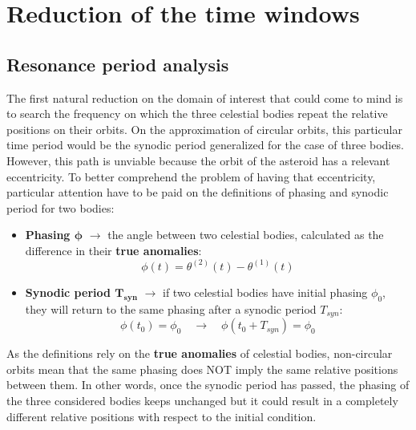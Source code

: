 \section{Reduction of the time windows}
\label{sec:time_red}

\subsection{Resonance period analysis}
\label{subsec:res_period}

The first natural reduction on the domain of interest that could come to mind is to search the frequency on which the three celestial bodies repeat the relative positions on their orbits. On the approximation of circular orbits, this particular time period would be the synodic period generalized for the case of three bodies.
However, this path is unviable because the orbit of the asteroid has a relevant eccentricity. To better comprehend the problem of having that eccentricity, particular attention have to be paid on the definitions of phasing and synodic period for two bodies:

\begin{itemize}
    [wide,itemsep=3pt,topsep=3pt]
    \item \textbf{Phasing $\bm{\phi}$} $\rightarrow$ the angle between two celestial bodies, calculated as the difference in their \textbf{true anomalies}:
    \vspace*{-8pt}
    \begin{equation}
        \phi (t) = \theta^{(2)} (t) - \theta^{(1)} (t)
    \end{equation}

    \item \textbf{Synodic period $\bm{T_{syn}}$} $\rightarrow$ if two celestial bodies have initial phasing $\phi_0$, they will return to the same phasing after a synodic period $T_{syn}$:
    \vspace*{-10pt}
    \begin{equation}
        \phi (t_0) = \phi_0 \quad \rightarrow \quad
        \phi (t_0 + T_{syn}) = \phi_0
    \end{equation}
\end{itemize}

As the definitions rely on the \textbf{true anomalies} of celestial bodies, non-circular orbits mean that the same phasing does NOT imply the same relative positions between them.
In other words, once the synodic period has passed, the phasing of the three considered bodies keeps unchanged but it could result in a completely different relative positions with respect to the initial condition.

